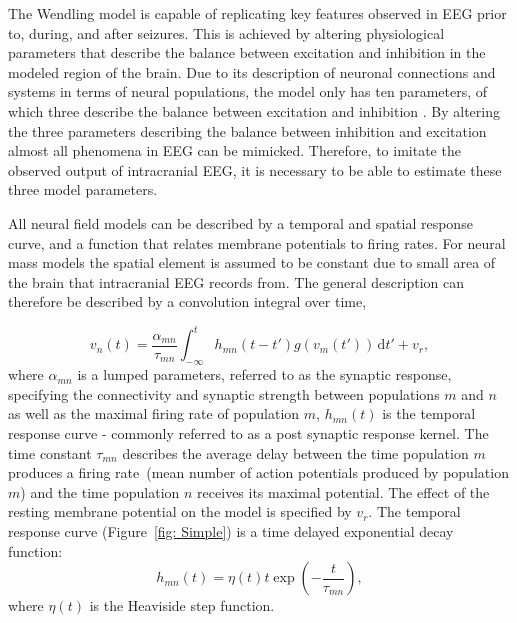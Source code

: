 The Wendling model is capable of replicating key features observed in EEG prior to, during, and after seizures. This is achieved by altering physiological parameters that describe the balance between excitation and inhibition in the modeled region of the brain. Due to its description of neuronal connections and systems in terms of neural populations, the model only has ten parameters, of which three describe the balance between excitation and inhibition \citep{wendling2002epileptic}. By altering the three parameters describing the balance between inhibition and excitation almost all phenomena in EEG can be mimicked. Therefore, to imitate the observed output of intracranial EEG, it is necessary to be able to estimate these three model parameters.
 
All neural field models can be described by a temporal and spatial response curve, and a function that relates membrane potentials to firing rates. For neural mass models the spatial element is assumed to be constant due to small area of the brain that intracranial EEG records from. The general description can therefore be described by a convolution integral over time,

\begin{equation}\label{eq:conv_eq}
    v_n(t) = \frac{\alpha_{mn}}{\tau_{mn}}\int_{-\infty}^t  h_{mn}(t-t')g(v_m(t')) \,\mathrm{d}t' + v_r,
\end{equation}
where $\alpha_{mn}$ is a lumped parameters, referred to as the synaptic response, specifying the connectivity and synaptic strength between populations $m$ and $n$ as well as the maximal firing rate of population $m$, $h_{mn}(t)$ is the temporal response curve - commonly referred to as a post synaptic response kernel. The time constant $\tau_{mn}$  describes the average delay between the time population $m$ produces a firing rate~(mean number of action potentials produced by population $m$) and the time population $n$ receives its maximal potential. The effect of the resting membrane potential on the model is specified by $v_r$. The temporal response curve (Figure~\ref{fig: Simple}) is a time delayed exponential decay function:
\begin{equation}
    h_{mn}(t) = \eta(t)t\exp\left(-\frac{t}{\tau_{mn}}\right),
\end{equation}
where $\eta(t)$ is the Heaviside step function. 

